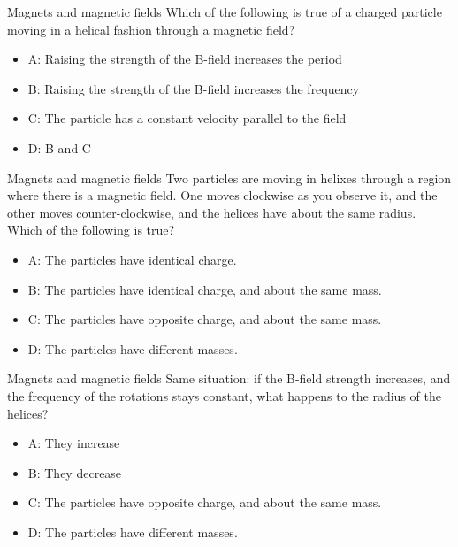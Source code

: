 \documentclass{beamer}
\begin{document}
\begin{frame}{Magnets and magnetic fields}
Which of the following is true of a charged particle moving in a helical fashion through a magnetic field?
\begin{itemize}
\item A: Raising the strength of the B-field increases the period
\item B: Raising the strength of the B-field increases the frequency
\item C: The particle has a constant velocity parallel to the field
\item D: B and C
\end{itemize}
\end{frame}

\begin{frame}{Magnets and magnetic fields}
Two particles are moving in helixes through a region where there is a magnetic field.  One moves clockwise as you observe it, and the other moves counter-clockwise, and the helices have about the same radius.  Which of the following is true?
\begin{itemize}
\item A: The particles have identical charge.
\item B: The particles have identical charge, and about the same mass.
\item C: The particles have opposite charge, and about the same mass.
\item D: The particles have different masses.
\end{itemize}
\end{frame}

\begin{frame}{Magnets and magnetic fields}
Same situation: if the B-field strength increases, and the frequency of the rotations stays constant, what happens to the radius of the helices?
\begin{itemize}
\item A: They increase
\item B: They decrease
\item C: The particles have opposite charge, and about the same mass.
\item D: The particles have different masses.
\end{itemize}
\end{frame}
\end{document}
